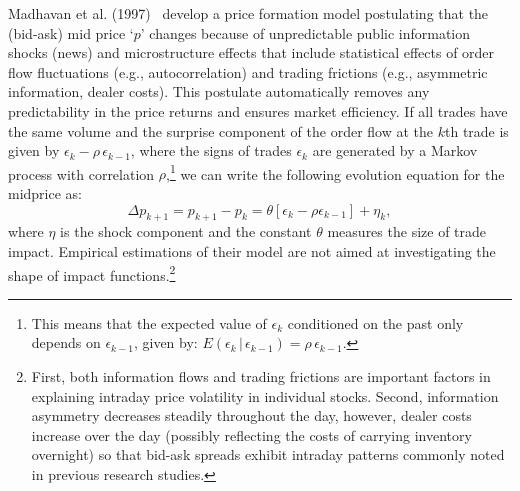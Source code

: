Madhavan et al. (1997)~\cite{madhaven1997} develop a price formation model postulating that the (bid-ask) mid price `$p$' changes because of unpredictable public information shocks (news) and microstructure effects that include statistical effects of order flow fluctuations (e.g., autocorrelation) and trading frictions (e.g., asymmetric information, dealer costs). This postulate automatically removes any predictability in the price returns and ensures market efficiency. If all trades have the same volume and the surprise component of the order flow at the $k$th trade is given by $\epsilon_k - \rho \,\epsilon_{k-1}$, where the signs of trades $\epsilon_k$ are generated by a Markov process with correlation $\rho$,\footnote{This means that the expected value of $\epsilon_k$ conditioned on the past only depends on $\epsilon_{k-1}$, given by: $E(\epsilon_k\,|\,\epsilon_{k-1})=\rho\,\epsilon_{k-1}$.}  we can write the following evolution equation for the midprice as:
	\begin{equation} \label{eqn:midpointdelta}
	\Delta p_{k+1}= p_{k+1} - p_k= \theta[ \epsilon_k - \rho \epsilon_{k-1}] + \eta_k,
	\end{equation}
where $\eta$ is the shock component and the constant $\theta$ measures the size of trade impact. Empirical estimations of their model are not aimed at investigating the shape of impact functions.\footnote{First, both information flows and trading frictions are important factors in explaining intraday price volatility in individual stocks. Second, information asymmetry decreases steadily throughout the day, however, dealer costs increase over the day (possibly reflecting the costs of carrying inventory overnight) so that bid-ask spreads exhibit intraday patterns commonly noted in previous research studies.}



